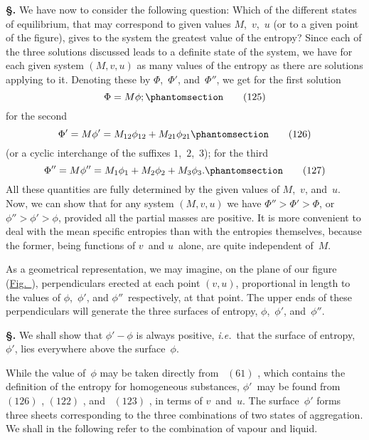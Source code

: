 \documentclass[12pt]{book}[2005/09/16]
\newcommand{\Chg}[2]{#2}
\newcommand{\Add}[1]{\Chg{}{#1}}
\newcommand{\Section}[1]{
  \medskip\par\textbf{§\;#1}
  \label{section:#1}
}
\newcommand{\Tag}[1]{%
  \phantomsection\label{eqn:#1}\tag*{\ensuremath{#1}}%
}
\newcommand{\Eq}[1]{%
  \hyperref[eqn:#1]{\ensuremath{#1}}%
}
\newcommand{\Fig}[1]{\hyperref[fig:#1]{Fig.~{\upshape #1}}}
\newcommand{\PageSep}[1]{\ignorespaces}
\newcommand{\ie}{\emph{i.e.}}
\begin{document}
\Section{193.} We have now to consider the following question:
Which of the different states of equilibrium, that may
correspond to given values $M$,~$v$,~$u$ (or to a given point of
the figure), gives to the system the greatest value of the
entropy? Since each of the three solutions discussed leads
to a definite state of the system, we have for each given
system $(M, v, u)$ as many values of the entropy as there are
solutions applying to it. Denoting these by $\Phi$,~$\Phi'$, and~$\Phi''$, we
get for the first solution
\[
\Phi = M\phi\Add{;}
\Tag{(125)}
\]
for the second
\[
\Phi' = M\phi' = M_{12} \phi_{12} + M_{21} \phi_{21}
\Tag{(126)}
\]
(or a cyclic interchange of the suffixes $1$,~$2$,~$3$); for the
third
\[
\Phi'' = M\phi'' = M_{1} \phi_{1} + M_{2} \phi_{2} + M_{3} \phi_{3}\Add{.}
\Tag{(127)}
\]
\PageSep{163}
All these quantities are fully determined by the given
values of $M$,~$v$, and~$u$. Now, we can show that for any system
$(M, v, u)$ we have $\Phi'' > \Phi' > \Phi$, or $\phi'' > \phi' > \phi$, provided all
the partial masses are positive. It is more convenient to
deal with the mean specific entropies than with the entropies
themselves, because the former, being functions of $v$~and
$u$~alone, are quite independent of~$M$.

As a geometrical representation, we may imagine, on the
plane of our figure (\Fig{4}), perpendiculars erected at each
point $(v, u)$, proportional in length to the values of $\phi$,~$\phi'$,
and $\phi''$~respectively, at that point. The upper ends of these
perpendiculars will generate the three surfaces of entropy,
$\phi$,~$\phi'$, and~$\phi''$.

\Section{194.} We shall show that $\phi' - \phi$ is always positive, \ie\
that the surface of entropy,~$\phi'$, lies everywhere above
the surface~$\phi$.

While the value of~$\phi$ may be taken directly from~\Eq{(61)},
which contains the definition of the entropy for homogeneous
substances, $\phi'$~may be found from \Eq{(126)}, \Eq{(122)}, and~\Eq{(123)}, in
terms of $v$~and~$u$. The surface~$\phi'$ forms three sheets corresponding
to the three combinations of two states of aggregation.
We shall in the following refer to the combination
of vapour and liquid.
\end{document}
